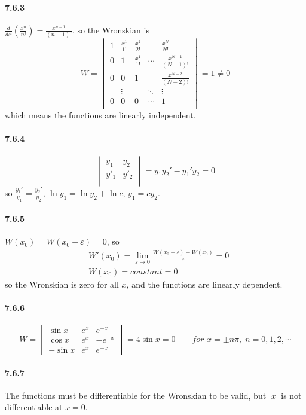 \documentclass[a4paper]{article}
\begin{document}
\paragraph{7.6.3}
\renewcommand{\arraystretch}{1.5}
$\frac{d}{dx}(\frac{x^n}{n!})=\frac{x^{n-1}}{(n-1)!}$, so the Wronskian is \[
W=
\begin{vmatrix}
1&\frac{x^1}{1!}&\frac{x^2}{2!}& &\frac{x^N}{N!}\\
0&1&\frac{x^1}{1!}&\cdots&\frac{x^{N-1}}{(N-1)!}\\
0&0&1& &\frac{x^{N-2}}{(N-2)!}\\
 &\vdots& &\ddots&\vdots\\
0&0&0&\cdots&1\\
\end{vmatrix}=1\neq0
\]
which means the functions are linearly independent.

\paragraph{7.6.4}
\[
\begin{vmatrix}
y_1&y_2\\
y'_1&y'_2\\
\end{vmatrix}=
y_1y_2'-y_1'y_2=0
\]
so $\frac{y_1'}{y_1}=\frac{y_2'}{y_2}$, \;$\ln y_1=\ln y_2+\ln c$,\; $y_1=cy_2$.

\paragraph{7.6.5}
$W(x_0)=W(x_0+\varepsilon)=0$, so
\begin{align*}
    & W'(x_0)=\lim_{\varepsilon\to0}\frac{W(x_0+\varepsilon)-W(x_0)}{\varepsilon}=0\\
    & W(x_0)=constant=0
\end{align*}
so the Wronskian is zero for all $x$, and the functions are linearly dependent.

\paragraph{7.6.6}
\[
W=\begin{vmatrix}
\sin x & e^x & e^{-x}\\
\cos x & e^x & -e^{-x}\\
-\sin x & e^x & e^{-x}
\end{vmatrix}
=4\sin x=0\qquad
\textit{for $x=\pm n\pi,\;n=0,1,2,\cdots$}
\]

\paragraph{7.6.7}
The functions must be differentiable for the Wronskian to be valid, but $|x|$ is not differentiable at $x=0$.
\end{document}
